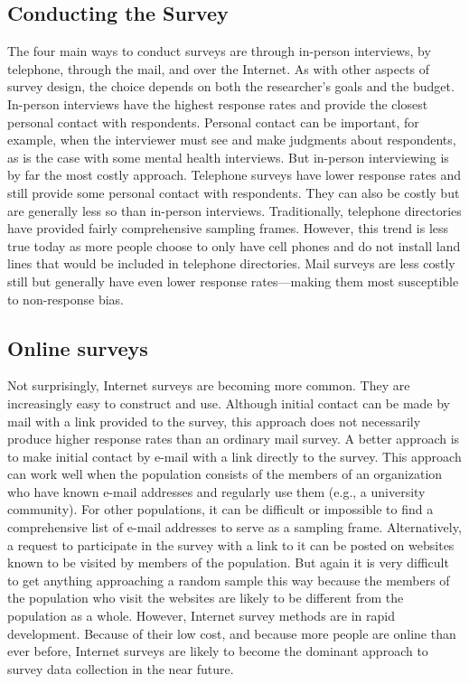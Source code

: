 \subsection{Conducting the Survey}


The four main ways to conduct surveys are through in-person interviews, by telephone, through the mail, and over the Internet. As with other aspects of survey design, the choice depends on both the researcher’s goals and the budget. In-person interviews have the highest response rates and provide the closest personal contact with respondents. Personal contact can be important, for example, when the interviewer must see and make judgments about respondents, as is the case with some mental health interviews. But in-person interviewing is by far the most costly approach. Telephone surveys have lower response rates and still provide some personal contact with respondents. They can also be costly but are generally less so than in-person interviews. Traditionally, telephone directories have provided fairly comprehensive sampling frames. However, this trend is less true today as more people choose to only have cell phones and do not install land lines that would be included in telephone
directories. Mail surveys are less costly still but generally have even lower response rates---making them most susceptible to non-response bias.


\subsection{Online surveys}


Not surprisingly, Internet surveys are becoming more common. They are increasingly easy to construct and use. Although initial contact can be made by mail with a link provided to the survey, this approach does not necessarily produce higher response rates than an ordinary mail survey. A better approach is to make initial contact by e-mail with a link directly to the survey. This approach can work well when the population consists of the members of an organization who have known e-mail addresses and regularly use them (e.g., a university community). For other populations, it can be difficult or impossible to find a comprehensive list of e-mail addresses to serve as a sampling frame. Alternatively, a request to participate in the survey with a link to it can be posted on websites known to be visited by members of the population. But again it is very difficult to get anything approaching a random sample this way because the members of the population who visit the websites are likely to be different from the population as a whole. However, Internet survey methods are in rapid development. Because of their low cost, and because more people are online than ever before, Internet surveys are likely to become the dominant approach to survey data collection in the near future.


